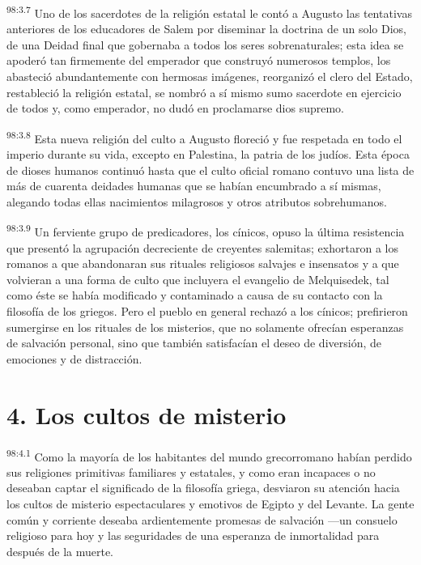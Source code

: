 \par
\textsuperscript{98:3.7} Uno de los sacerdotes de la religión estatal le contó a Augusto las tentativas anteriores de los educadores de Salem por diseminar la doctrina de un solo Dios, de una Deidad final que gobernaba a todos los seres sobrenaturales; esta idea se apoderó tan firmemente del emperador que construyó numerosos templos, los abasteció abundantemente con hermosas imágenes, reorganizó el clero del Estado, restableció la religión estatal, se nombró a sí mismo sumo sacerdote en ejercicio de todos y, como emperador, no dudó en proclamarse dios supremo.

\par
\textsuperscript{98:3.8} Esta nueva religión del culto a Augusto floreció y fue respetada en todo el imperio durante su vida, excepto en Palestina, la patria de los judíos. Esta época de dioses humanos continuó hasta que el culto oficial romano contuvo una lista de más de cuarenta deidades humanas que se habían encumbrado a sí mismas, alegando todas ellas nacimientos milagrosos y otros atributos sobrehumanos.

\par
\textsuperscript{98:3.9} Un ferviente grupo de predicadores, los cínicos, opuso la última resistencia que presentó la agrupación decreciente de creyentes salemitas; exhortaron a los romanos a que abandonaran sus rituales religiosos salvajes e insensatos y a que volvieran a una forma de culto que incluyera el evangelio de Melquisedek, tal como éste se había modificado y contaminado a causa de su contacto con la filosofía de los griegos. Pero el pueblo en general rechazó a los cínicos; prefirieron sumergirse en los rituales de los misterios, que no solamente ofrecían esperanzas de salvación personal, sino que también satisfacían el deseo de diversión, de emociones y de distracción.

\section*{4. Los cultos de misterio}
\par
\textsuperscript{98:4.1} Como la mayoría de los habitantes del mundo grecorromano habían perdido sus religiones primitivas familiares y estatales, y como eran incapaces o no deseaban captar el significado de la filosofía griega, desviaron su atención hacia los cultos de misterio espectaculares y emotivos de Egipto y del Levante. La gente común y corriente deseaba ardientemente promesas de salvación ---un consuelo religioso para hoy y las seguridades de una esperanza de inmortalidad para después de la muerte.

